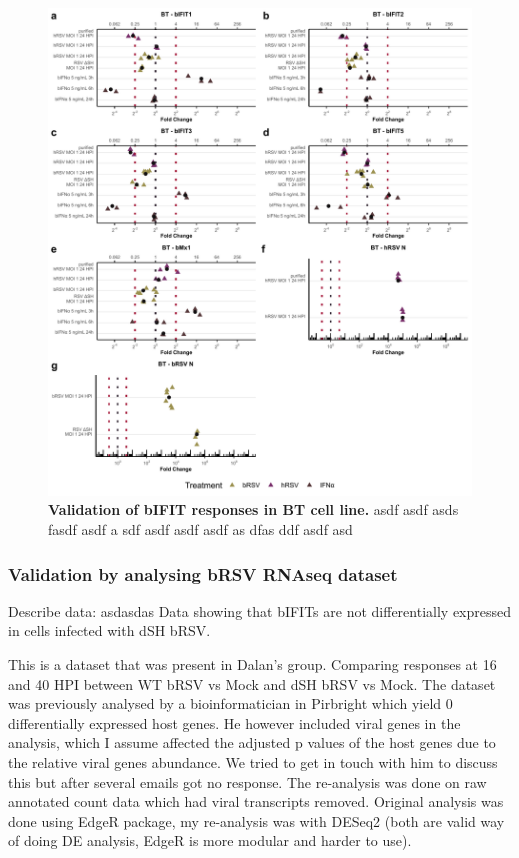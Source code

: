 \begin{figure}
    \centering
    \includegraphics[width=1\linewidth]{07. Chapter 2//Figs/08. bt_plots.pdf}
    \caption[ Validation of bIFIT responses in BT cell line.]{\textbf{ Validation of bIFIT responses in BT cell line.} asdf asdf asds fasdf asdf a sdf asdf asdf asdf as dfas ddf asdf asd}
    \label{ Validation of bIFIT responses in BT cell line}
\end{figure}

\subsubsection{Validation by analysing bRSV RNAseq dataset} \label{Validation by analysing bRSV RNAseq dataset}
Describe data: \newline
asdasdas \newline
Data showing that bIFITs are not differentially expressed in cells infected with dSH bRSV.

This is a dataset that was present in Dalan’s group. Comparing responses at 16 and 40 HPI between WT bRSV vs Mock and dSH bRSV vs Mock. The dataset was previously analysed by a bioinformatician in Pirbright which yield 0 differentially expressed host genes. He however included viral genes in the analysis, which I assume affected the adjusted p values of the host genes due to the relative viral genes abundance. We tried to get in touch with him to discuss this but after several emails got no response. The re-analysis was done on raw annotated count data which had viral transcripts removed. Original analysis was done using EdgeR package, my re-analysis was with DESeq2 (both are valid way of doing DE analysis, EdgeR is more modular and harder to use).

